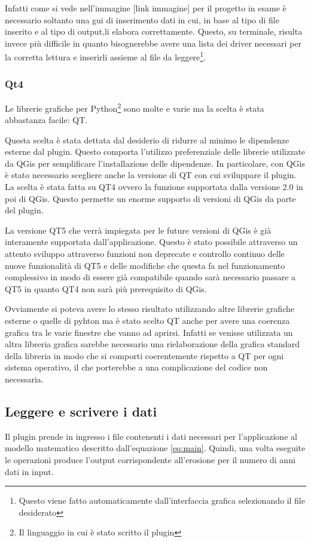 
Infatti come si vede nell'immagine [link immagine] per il progetto in esame è necessario soltanto una gui di inserimento dati in cui, in base al tipo di file inserito e al tipo di output,li elabora correttamente. Questo, su terminale, risulta invece più difficile in quanto bisognerebbe avere una lista dei driver necessari per la corretta lettura e inserirli assieme al file da leggere\footnote{Questo viene fatto automaticamente dall'interfaccia grafica selezionando il file desiderato}.

\subsubsection{Qt4}

Le librerie grafiche per Python\footnote{Il linguaggio in cui è stato scritto il plugin} sono molte e varie ma la scelta è stata abbastanza facile: QT.

Questa scelta è stata dettata dal desiderio di ridurre al minimo le dipendenze esterne dal plugin. Questo comporta l'utilizzo preferenziale delle librerie utilizzate da QGis per semplificare l'installazione delle dipendenze. In particolare, con QGis è stato necessario scegliere anche la versione di QT con cui sviluppare il plugin. La scelta è stata fatta su QT4 ovvero la funzione supportata dalla versione 2.0 in poi di QGis.  Questo permette un enorme supporto di versioni di QGis da parte del plugin. 

La versione QT5 che verrà impiegata per le future versioni di QGis è già interamente supportata dall'applicazione. Questo è stato possibile attraverso un attento sviluppo attraverso funzioni non deprecate e controllo continuo delle nuove funzionalità di QT5 e delle modifiche che questa fa nel funzionamento complessivo in modo di essere già compatibile quando sarà necessario passare a QT5 in quanto QT4 non sarà più prerequisito di QGis.

Ovviamente si poteva avere lo stesso risultato utilizzando altre librerie grafiche esterne o quelle di pyhton ma è stato scelto QT anche per avere una coerenza grafica tra le varie finestre che vanno ad aprirsi. Infatti se venisse utilizzata un altra libreria grafica sarebbe necessario una rielaborazione della grafica standard della libreria in modo che si comporti coerentemente rispetto a QT per ogni sistema operativo, il che porterebbe a una complicazione del codice non necessaria.

\subsection{Leggere e scrivere i dati}
Il plugin prende in ingresso i file contenenti i dati necessari per l'applicazione al modello matematico descritto dall'equazione \ref{eq:main}. Quindi, una volta eseguite le operazioni produce l'output corrispondente all'erosione per il numero di anni dati in input.

